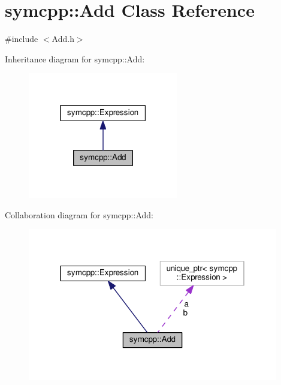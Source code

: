 \hypertarget{classsymcpp_1_1Add}{}\section{symcpp\+:\+:Add Class Reference}
\label{classsymcpp_1_1Add}


{\ttfamily \#include $<$Add.\+h$>$}



Inheritance diagram for symcpp\+:\+:Add\+:\nopagebreak
\begin{figure}[H]
\begin{center}
\leavevmode
\includegraphics[width=186pt]{classsymcpp_1_1Add__inherit__graph}
\end{center}
\end{figure}


Collaboration diagram for symcpp\+:\+:Add\+:\nopagebreak
\begin{figure}[H]
\begin{center}
\leavevmode
\includegraphics[width=310pt]{classsymcpp_1_1Add__coll__graph}
\end{center}
\end{figure}
